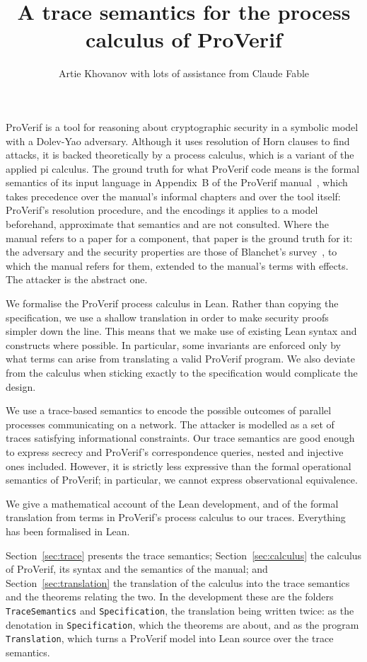 \documentclass[11pt]{article}
\title{A trace semantics for the process calculus of ProVerif}
\author{Artie Khovanov with lots of assistance from Claude Fable}
\date{}
\theoremstyle{definition}
\theoremstyle{plain}
\theoremstyle{remark}
\begin{document}
\maketitle

ProVerif is a tool for reasoning about cryptographic security in a symbolic model with a Dolev-Yao adversary. Although it uses resolution of Horn clauses to find attacks, it is backed theoretically by a process calculus, which is a variant of the applied pi calculus. The ground truth for what ProVerif code means is the formal semantics of its input language in Appendix~B of the ProVerif manual~\cite{ProVerifManual}, which takes precedence over the manual's informal chapters and over the tool itself: ProVerif's resolution procedure, and the encodings it applies to a model beforehand, approximate that semantics and are not consulted. Where the manual refers to a paper for a component, that paper is the ground truth for it: the adversary and the security properties are those of Blanchet's survey~\cite{BlanchetFnTPS16}, to which the manual refers for them, extended to the manual's terms with effects. The attacker is the abstract one.

We formalise the ProVerif process calculus in Lean. Rather than copying the specification, we use a shallow translation in order to make security proofs simpler down the line. This means that we make use of existing Lean syntax and constructs where possible. In particular, some invariants are enforced only by what terms can arise from translating a valid ProVerif program. We also deviate from the calculus when sticking exactly to the specification would complicate the design.

We use a trace-based semantics to encode the possible outcomes of parallel processes communicating on a network. The attacker is modelled as a set of traces satisfying informational constraints. Our trace semantics are good enough to express secrecy and ProVerif's correspondence queries, nested and injective ones included. However, it is strictly less expressive than the formal operational semantics of ProVerif; in particular, we cannot express observational equivalence.

We give a mathematical account of the Lean development, and of the formal translation from terms in ProVerif's process calculus to our traces. Everything has been formalised in Lean.

Section~\ref{sec:trace} presents the trace semantics; Section~\ref{sec:calculus} the calculus of ProVerif, its syntax and the semantics of the manual; and Section~\ref{sec:translation} the translation of the calculus into the trace semantics and the theorems relating the two. In the development these are the folders \texttt{TraceSemantics} and \texttt{Specification}, the translation being written twice: as the denotation in \texttt{Specification}, which the theorems are about, and as the program \texttt{Translation}, which turns a ProVerif model into Lean source over the trace semantics.
\end{document}
